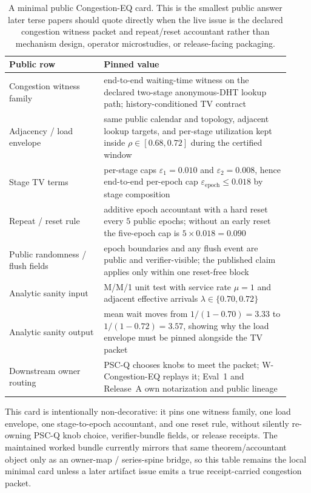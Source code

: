 \documentclass[11pt]{article}
\theoremstyle{definition}
\theoremstyle{remark}
\newcommand{\eps}{\varepsilon}
\begin{document}
\begin{table}[t]
\centering
\small
\begin{tabular}{@{}p{0.31\linewidth}p{0.61\linewidth}@{}}
\toprule
\textbf{Public row} & \textbf{Pinned value}\\
\midrule
Congestion witness family & end-to-end waiting-time witness on the declared two-stage anonymous-DHT lookup path; history-conditioned TV contract\\
Adjacency / load envelope & same public calendar and topology, adjacent lookup targets, and per-stage utilization kept inside $\rho\in[0.68,0.72]$ during the certified window\\
Stage TV terms & per-stage caps $\eps_1=0.010$ and $\eps_2=0.008$, hence end-to-end per-epoch cap $\eps_{\mathrm{epoch}}\le 0.018$ by stage composition\\
Repeat / reset rule & additive epoch accountant with a hard reset every $5$ public epochs; without an early reset the five-epoch cap is $5\times 0.018=0.090$\\
Public randomness / flush fields & epoch boundaries and any flush event are public and verifier-visible; the published claim applies only within one reset-free block\\
Analytic sanity input & M/M/1 unit test with service rate $\mu=1$ and adjacent effective arrivals $\lambda\in\{0.70,0.72\}$\\
Analytic sanity output & mean wait moves from $1/(1-0.70)=3.33$ to $1/(1-0.72)=3.57$, showing why the load envelope must be pinned alongside the TV packet\\
Downstream owner routing & PSC-Q chooses knobs to meet the packet; W-Congestion-EQ replays it; Eval~1 and Release~A own notarization and public lineage\\
\bottomrule
\end{tabular}
\caption{A minimal public Congestion-EQ card. This is the smallest public answer later terse papers should quote directly when the live issue is the declared congestion witness packet and repeat/reset accountant rather than mechanism design, operator microstudies, or release-facing packaging.}
\label{tab:minimal-congeq-card}
\end{table}

This card is intentionally non-decorative: it pins one witness family, one load envelope, one stage-to-epoch accountant, and one reset rule, without silently re-owning PSC-Q knob choice, verifier-bundle fields, or release receipts. The maintained worked bundle currently mirrors that same theorem/accountant object only as an owner-map / series-spine bridge, so this table remains the local minimal card unless a later artifact issue emits a true receipt-carried congestion packet.
\end{document}
